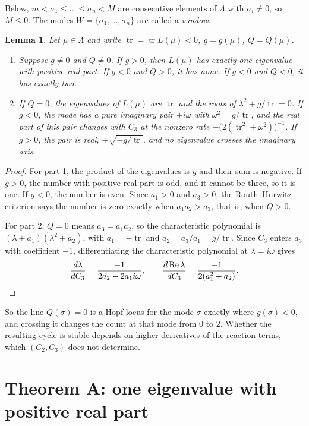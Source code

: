 \documentclass[11pt]{article}
\newtheorem{lemma}{Lemma}
\theoremstyle{definition}
\theoremstyle{remark}
\begin{document}
Below, $m<\sigma_1\le\dots\le\sigma_n<M$ are consecutive elements of $\Lambda$ with $\sigma_i\neq0$, so $M\le0$. The modes $W=\{\sigma_1,\dots,\sigma_n\}$ are called a \emph{window}.

\begin{lemma}\label{lem:count}
Let $\mu\in\Lambda$ and write $\operatorname{tr}=\operatorname{tr}L(\mu)<0$, $g=g(\mu)$, $Q=Q(\mu)$.
\begin{enumerate}
\item Suppose $g\neq0$ and $Q\neq0$. If $g>0$, then $L(\mu)$ has exactly one eigenvalue with positive real part. If $g<0$ and $Q>0$, it has none. If $g<0$ and $Q<0$, it has exactly two.
\item If $Q=0$, the eigenvalues of $L(\mu)$ are $\operatorname{tr}$ and the roots of $\lambda^2+g/\operatorname{tr}=0$. If $g<0$, the mode has a pure imaginary pair $\pm i\omega$ with $\omega^2=g/\operatorname{tr}$, and the real part of this pair changes with $C_3$ at the nonzero rate $-\bigl(2(\operatorname{tr}^2+\omega^2)\bigr)^{-1}$. If $g>0$, the pair is real, $\pm\sqrt{-g/\operatorname{tr}}$, and no eigenvalue crosses the imaginary axis.
\end{enumerate}
\end{lemma}

\begin{proof}
For part 1, the product of the eigenvalues is $g$ and their sum is negative. If $g>0$, the number with positive real part is odd, and it cannot be three, so it is one. If $g<0$, the number is even. Since $a_1>0$ and $a_3>0$, the Routh--Hurwitz criterion says the number is zero exactly when $a_1a_2>a_3$, that is, when $Q>0$.

For part 2, $Q=0$ means $a_3=a_1a_2$, so the characteristic polynomial is $(\lambda+a_1)(\lambda^2+a_2)$, with $a_1=-\operatorname{tr}$ and $a_2=a_3/a_1=g/\operatorname{tr}$. Since $C_3$ enters $a_3$ with coefficient $-1$, differentiating the characteristic polynomial at $\lambda=i\omega$ gives
\[
\frac{d\lambda}{dC_3}=\frac{-1}{2a_2-2a_1i\omega},
\qquad
\frac{d\operatorname{Re}\lambda}{dC_3}=\frac{-1}{2(a_1^2+a_2)}.
\qedhere
\]
\end{proof}

So the line $Q(\sigma)=0$ is a Hopf locus for the mode $\sigma$ exactly where $g(\sigma)<0$, and crossing it changes the count at that mode from $0$ to $2$. Whether the resulting cycle is stable depends on higher derivatives of the reaction terms, which $(C_2,C_3)$ does not determine.

\section{Theorem A: one eigenvalue with positive real part}
\end{document}
